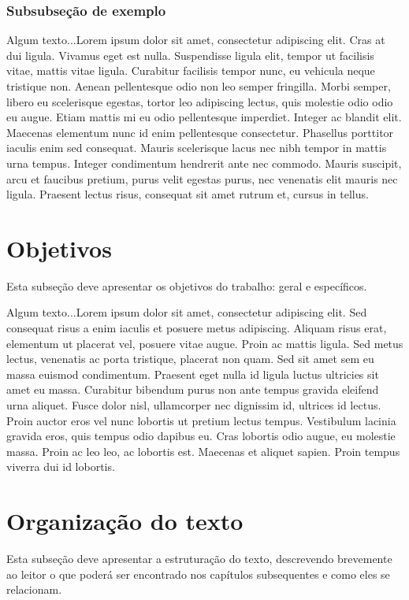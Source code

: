 \documentclass[quali]{mpit}
\begin{document}
\subsubsection{Subsubseção de exemplo}

Algum texto...Lorem ipsum dolor sit amet, consectetur adipiscing elit. Cras at dui ligula. Vivamus eget est nulla. Suspendisse ligula elit, tempor ut facilisis vitae, mattis vitae ligula. Curabitur facilisis tempor nunc, eu vehicula neque tristique non. Aenean pellentesque odio non leo semper fringilla. Morbi semper, libero eu scelerisque egestas, tortor leo adipiscing lectus, quis molestie odio odio eu augue. Etiam mattis mi eu odio pellentesque imperdiet. Integer ac blandit elit. Maecenas elementum nunc id enim pellentesque consectetur. Phasellus porttitor iaculis enim sed consequat. Mauris scelerisque lacus nec nibh tempor in mattis urna tempus. Integer condimentum hendrerit ante nec commodo. Mauris suscipit, arcu et faucibus pretium, purus velit egestas purus, nec venenatis elit mauris nec ligula. Praesent lectus risus, consequat sit amet rutrum et, cursus in tellus.

\section{Objetivos}

Esta subseção deve apresentar os objetivos do trabalho: geral e específicos.

Algum texto...Lorem ipsum dolor sit amet, consectetur adipiscing elit. Sed consequat risus a enim iaculis et posuere metus adipiscing. Aliquam risus erat, elementum ut placerat vel, posuere vitae augue. Proin ac mattis ligula. Sed metus lectus, venenatis ac porta tristique, placerat non quam. Sed sit amet sem eu massa euismod condimentum. Praesent eget nulla id ligula luctus ultricies sit amet eu massa. Curabitur bibendum purus non ante tempus gravida eleifend urna aliquet. Fusce dolor nisl, ullamcorper nec dignissim id, ultrices id lectus. Proin auctor eros vel nunc lobortis ut pretium lectus tempus. Vestibulum lacinia gravida eros, quis tempus odio dapibus eu. Cras lobortis odio augue, eu molestie massa. Proin ac leo leo, ac lobortis est. Maecenas et aliquet sapien. Proin tempus viverra dui id lobortis.

\section{Organização do texto}

Esta subseção deve apresentar a estruturação do texto, descrevendo brevemente ao leitor o que poderá ser encontrado nos capítulos subsequentes e como eles se relacionam.
\end{document}
